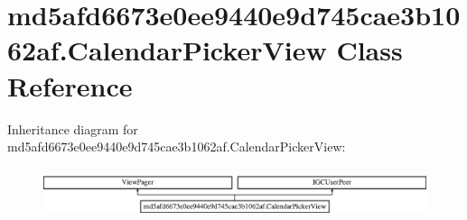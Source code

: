 \hypertarget{classmd5afd6673e0ee9440e9d745cae3b1062af_1_1CalendarPickerView}{}\section{md5afd6673e0ee9440e9d745cae3b1062af.\+Calendar\+Picker\+View Class Reference}
\label{classmd5afd6673e0ee9440e9d745cae3b1062af_1_1CalendarPickerView}
Inheritance diagram for md5afd6673e0ee9440e9d745cae3b1062af.\+Calendar\+Picker\+View\+:\begin{figure}[H]
\begin{center}
\leavevmode
\includegraphics[height=1.469816cm]{classmd5afd6673e0ee9440e9d745cae3b1062af_1_1CalendarPickerView}
\end{center}
\end{figure}
